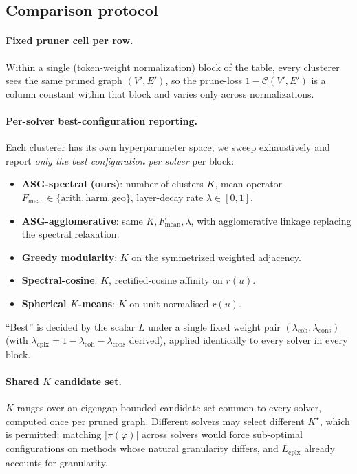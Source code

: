 \subsection{Comparison protocol}\label{sec:eval-protocol}

\paragraph{Fixed pruner cell per row.}
Within a single (token-weight normalization) block of the table, every
clusterer sees the same pruned graph $(V', E')$, so the prune-loss
$1 - \mathcal{C}(V', E')$ is a column constant within that block and
varies only across normalizations.

\paragraph{Per-solver best-configuration reporting.}
Each clusterer has its own hyperparameter space; we sweep exhaustively
and report \emph{only the best configuration per solver} per block:
\begin{itemize}[leftmargin=*,topsep=2pt,itemsep=1pt]
\item \textbf{ASG-spectral (ours)}: number of clusters $K$, mean
operator $F_{\text{mean}} \in \{\text{arith}, \text{harm}, \text{geo}\}$,
layer-decay rate $\lambda \in [0, 1]$.
\item \textbf{ASG-agglomerative}: same $K, F_{\text{mean}}, \lambda$,
with agglomerative linkage replacing the spectral relaxation.
\item \textbf{Greedy modularity}: $K$ on the symmetrized weighted
adjacency.
\item \textbf{Spectral-cosine}: $K$, rectified-cosine affinity on
$r(u)$.
\item \textbf{Spherical $K$-means}: $K$ on unit-normalised $r(u)$.
\end{itemize}
``Best'' is decided by the scalar $L$ under a single fixed weight
pair $(\lambda_{\text{coh}}, \lambda_{\text{cons}})$ (with
$\lambda_{\text{cplx}} = 1 - \lambda_{\text{coh}} - \lambda_{\text{cons}}$
derived), applied identically to every solver in every block.

\paragraph{Shared $K$ candidate set.}
$K$ ranges over an eigengap-bounded candidate set common to every
solver, computed once per pruned graph. Different solvers may select
different $K^\star$, which is permitted: matching $|\pi(\varphi)|$
across solvers would force sub-optimal configurations on methods whose
natural granularity differs, and $L_{\text{cplx}}$ already accounts for
granularity.
